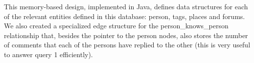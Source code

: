 \documentclass{article}
\begin{document}





This memory-based design, implemented in Java, defines data structures for each 
of the relevant entities defined in this database: person, tags, places and 
forums. We also created a specialized edge structure for the person\_knows\_person
relationship that, besides the pointer to the person nodes, also stores
the number of comments that each of the persons have replied to the other (this
is very useful to answer query 1 efficiently). 
\end{document}
